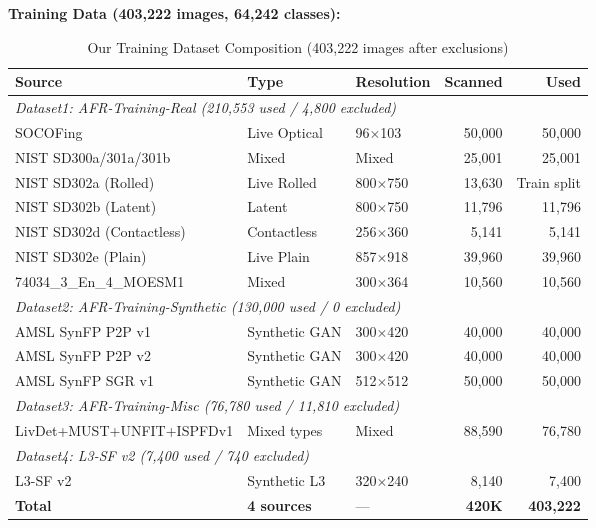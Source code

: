 \documentclass[conference]{IEEEtran}
\begin{document}
\textbf{Training Data (403,222 images, 64,242 classes):}

\begin{table}[h]
\centering
\caption{Our Training Dataset Composition (403,222 images after exclusions)}
\begin{tabular}{lllrr}
\toprule
\textbf{Source} & \textbf{Type} & \textbf{Resolution} & \textbf{Scanned} & \textbf{Used} \\
\midrule
\multicolumn{5}{l}{\textit{Dataset1: AFR-Training-Real (210,553 used / 4,800 excluded)}} \\
SOCOFing & Live Optical & 96$\times$103 & 50,000 & 50,000 \\
NIST SD300a/301a/301b & Mixed & Mixed & 25,001 & 25,001 \\
NIST SD302a (Rolled) & Live Rolled & 800$\times$750 & 13,630 & Train split \\
NIST SD302b (Latent) & Latent & 800$\times$750 & 11,796 & 11,796 \\
NIST SD302d (Contactless) & Contactless & 256$\times$360 & 5,141 & 5,141 \\
NIST SD302e (Plain) & Live Plain & 857$\times$918 & 39,960 & 39,960 \\
74034\_3\_En\_4\_MOESM1 & Mixed & 300$\times$364 & 10,560 & 10,560 \\
\midrule
\multicolumn{5}{l}{\textit{Dataset2: AFR-Training-Synthetic (130,000 used / 0 excluded)}} \\
AMSL SynFP P2P v1 & Synthetic GAN & 300$\times$420 & 40,000 & 40,000 \\
AMSL SynFP P2P v2 & Synthetic GAN & 300$\times$420 & 40,000 & 40,000 \\
AMSL SynFP SGR v1 & Synthetic GAN & 512$\times$512 & 50,000 & 50,000 \\
\midrule
\multicolumn{5}{l}{\textit{Dataset3: AFR-Training-Misc (76,780 used / 11,810 excluded)}} \\
LivDet+MUST+UNFIT+ISPFDv1 & Mixed types & Mixed & 88,590 & 76,780 \\
\midrule
\multicolumn{5}{l}{\textit{Dataset4: L3-SF v2 (7,400 used / 740 excluded)}} \\
L3-SF v2 & Synthetic L3 & 320$\times$240 & 8,140 & 7,400 \\
\midrule
\textbf{Total} & \textbf{4 sources} & --- & \textbf{420K} & \textbf{403,222} \\
\bottomrule
\end{tabular}
\label{tab:dataset}
\end{table}
\end{document}
